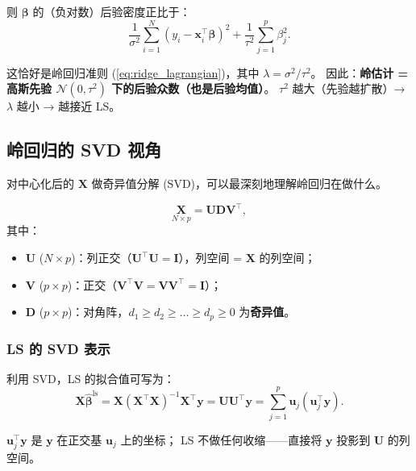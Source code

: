 则 $\bm{\beta}$ 的（负对数）后验密度正比于：
\[
    \frac{1}{\sigma^2}\sum_{i=1}^{N} (y_i - \mathbf{x}_i^\top \bm{\beta})^2
    + \frac{1}{\tau^2} \sum_{j=1}^{p} \beta_j^2.
\]

这恰好是岭回归准则 (\ref{eq:ridge_lagrangian})，其中 $\lambda = \sigma^2 / \tau^2$。
因此：\textbf{岭估计 = 高斯先验 $\mathcal{N}(0, \tau^2)$ 下的后验众数（也是后验均值）}。
$\tau^2$ 越大（先验越扩散）→ $\lambda$ 越小 → 越接近 LS。

\subsection{岭回归的 SVD 视角}

对中心化后的 $\mathbf{X}$ 做奇异值分解 (SVD)，可以最深刻地理解岭回归在做什么。

\begin{definition}
\begin{equation}\label{eq:svd}
    \underset{N \times p}{\mathbf{X}} = \mathbf{U} \mathbf{D} \mathbf{V}^\top,
\end{equation}
其中：
\begin{itemize}
    \item $\mathbf{U}$ ($N \times p$)：列正交（$\mathbf{U}^\top \mathbf{U} = \mathbf{I}$），列空间 = $\mathbf{X}$ 的列空间；
    \item $\mathbf{V}$ ($p \times p$)：正交（$\mathbf{V}^\top \mathbf{V} = \mathbf{V}\mathbf{V}^\top = \mathbf{I}$）；
    \item $\mathbf{D}$ ($p \times p$)：对角阵，$d_1 \ge d_2 \ge \dots \ge d_p \ge 0$ 为\textbf{奇异值}。
\end{itemize}
\end{definition}

\subsubsection{LS 的 SVD 表示}

利用 SVD，LS 的拟合值可写为：
\begin{equation}\label{eq:ls_svd}
    \mathbf{X}\hat{\bm{\beta}}^{\text{ls}}
    = \mathbf{X}(\mathbf{X}^\top \mathbf{X})^{-1} \mathbf{X}^\top \mathbf{y}
    = \mathbf{U} \mathbf{U}^\top \mathbf{y}
    = \sum_{j=1}^{p} \mathbf{u}_j (\mathbf{u}_j^\top \mathbf{y}).
\end{equation}

$\mathbf{u}_j^\top \mathbf{y}$ 是 $\mathbf{y}$ 在正交基 $\mathbf{u}_j$ 上的坐标；
LS 不做任何收缩——直接将 $\mathbf{y}$ 投影到 $\mathbf{U}$ 的列空间。

